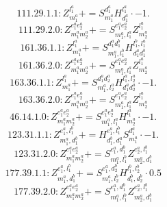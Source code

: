 \documentclass[letterpaper,10pt,fleqn,leqno,onecolumn]{article}
\begin{document}
\begin{equation} \;\;\;\;\;\;  111.29.1.1: Z^{l_{1}^{a}}_{m_{1}^{a}}+=S^{d_{1}^{a}}_{m_{1}^{a}}H^{l_{1}^{a}}_{d_{1}^{a}}\cdot -1. \end{equation}
\begin{equation} \;\;\;\;\;\;  111.29.2.0: Z^{e_{1}^{a}e_{2}^{a}}_{m_{1}^{a}m_{2}^{a}}+=S^{e_{1}^{a}e_{2}^{a}}_{m_{1}^{a},l_{1}^{a}}Z^{l_{1}^{a}}_{m_{2}^{a}} \end{equation}
\begin{equation} \;\;\;\;\;\;  161.36.1.1: Z^{l_{1}^{a}}_{m_{1}^{a}}+=S^{d_{1}^{a}d_{1}^{b}}_{m_{1}^{a},l_{1}^{b}}H^{l_{1}^{b},l_{1}^{a}}_{d_{1}^{a}d_{1}^{b}} \end{equation}
\begin{equation} \;\;\;\;\;\;  161.36.2.0: Z^{e_{1}^{a}e_{2}^{a}}_{m_{1}^{a}m_{2}^{a}}+=S^{e_{1}^{a}e_{2}^{a}}_{m_{1}^{a},l_{1}^{a}}Z^{l_{1}^{a}}_{m_{2}^{a}} \end{equation}
\begin{equation} \;\;\;\;\;\;  163.36.1.1: Z^{l_{1}^{a}}_{m_{1}^{a}}+=S^{d_{1}^{a}d_{2}^{a}}_{m_{1}^{a},l_{2}^{a}}H^{l_{1}^{a},l_{2}^{a}}_{d_{1}^{a}d_{2}^{a}}\cdot -1. \end{equation}
\begin{equation} \;\;\;\;\;\;  163.36.2.0: Z^{e_{1}^{a}e_{2}^{a}}_{m_{1}^{a}m_{2}^{a}}+=S^{e_{1}^{a}e_{2}^{a}}_{m_{1}^{a},l_{1}^{a}}Z^{l_{1}^{a}}_{m_{2}^{a}} \end{equation}
\begin{equation} \;\;\;\;\;\;  46.14.1.0: Z^{e_{1}^{a}e_{2}^{a}}_{m_{1}^{a}m_{2}^{a}}+=S^{e_{1}^{a}e_{2}^{a}}_{m_{1}^{a},l_{1}^{a}}H^{l_{1}^{a}}_{m_{2}^{a}}\cdot -1. \end{equation}
\begin{equation} \;\;\;\;\;\;  123.31.1.1: Z^{e_{1}^{a},l_{1}^{b}}_{m_{1}^{a},d_{1}^{b}}+=H^{e_{1}^{a},l_{1}^{b}}_{d_{1}^{b},d_{1}^{a}}S^{d_{1}^{a}}_{m_{1}^{a}}\cdot -1. \end{equation}
\begin{equation} \;\;\;\;\;\;  123.31.2.0: Z^{e_{1}^{a}e_{2}^{a}}_{m_{1}^{a}m_{2}^{a}}+=S^{e_{1}^{a},d_{1}^{b}}_{m_{1}^{a},l_{1}^{b}}Z^{e_{2}^{a},l_{1}^{b}}_{m_{2}^{a},d_{1}^{b}} \end{equation}
\begin{equation} \;\;\;\;\;\;  177.39.1.1: Z^{e_{1}^{a},l_{1}^{b}}_{m_{1}^{a},d_{1}^{b}}+=S^{e_{1}^{a},d_{2}^{b}}_{m_{1}^{a},l_{2}^{b}}H^{l_{1}^{b},l_{2}^{b}}_{d_{1}^{b},d_{2}^{b}}\cdot 0.5 \end{equation}
\begin{equation} \;\;\;\;\;\;  177.39.2.0: Z^{e_{1}^{a}e_{2}^{a}}_{m_{1}^{a}m_{2}^{a}}+=S^{e_{1}^{a},d_{1}^{b}}_{m_{1}^{a},l_{1}^{b}}Z^{e_{2}^{a},l_{1}^{b}}_{m_{2}^{a},d_{1}^{b}} \end{equation}
\end{document}
